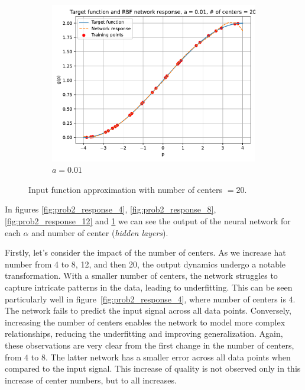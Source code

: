 \begin{figure}[htbp]
\begin{subfigure}{0.33\linewidth}
		\includegraphics[width=\linewidth]{../Problem 2/prob2_response_a_0.01_Cnum_20.pdf}
		\caption{$a=0.01$}
	\end{subfigure}\hfill
	\caption{Input function approximation with number of centers $=20$.}
	\label{fig:prob2_response_20}
\end{figure}

In figures \ref{fig:prob2_response_4}, \ref{fig:prob2_response_8}, \ref{fig:prob2_response_12} and \ref{fig:prob2_response_20} we can see the output of the neural network for each $\alpha$ and number of center (\textit{hidden layers}).

Firstly, let's consider the impact of the number of centers. As we increase hat number from 4 to 8, 12, and then 20, the output dynamics undergo a notable transformation. With a smaller number of centers, the network struggles to capture intricate patterns in the data, leading to underfitting.
This can be seen particularly well in figure~\ref{fig:prob2_response_4}, where number of centers is $4$. The network fails to predict the input signal across all data points.
Conversely, increasing the number of centers enables the network to model more complex relationships, reducing the underfitting and improving generalization.
Again, these observations are very clear from the first change in the number of centers, from $4$ to $8$. The latter network has a smaller error across all data points when compared to the input signal. This increase of quality is not observed only in this increase of center numbers, but to all increases.

